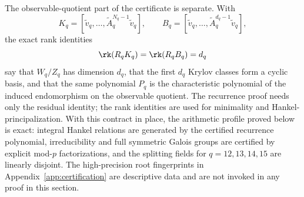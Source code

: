 The observable-quotient part of the certificate is separate.  With
\[
  K_q=[\widetilde v_q,\dots,\widetilde A_q^{N_q-1}\widetilde v_q],
  \qquad
  B_q=[\widetilde v_q,\dots,\widetilde A_q^{d_q-1}\widetilde v_q],
\]
the exact rank identities
\[
  \rk(R_qK_q)=\rk(R_qB_q)=d_q
\]
say that \(W_q/Z_q\) has dimension \(d_q\), that the first \(d_q\) Krylov
classes form a cyclic basis, and that the same polynomial \(P_q\) is the
characteristic polynomial of the induced endomorphism on the observable
quotient.  The recurrence proof needs only the residual identity; the rank
identities are used for minimality and Hankel-principalization.  With this
contract in place, the arithmetic profile proved below is exact: integral Hankel
relations are generated by the certified recurrence polynomial, irreducibility
and full symmetric Galois groups are certified by explicit mod-\(p\)
factorizations, and the splitting fields for \(q=12,13,14,15\) are linearly
disjoint.  The high-precision root fingerprints in
Appendix~\ref{app:certification} are descriptive data and are not invoked in any
proof in this section.

